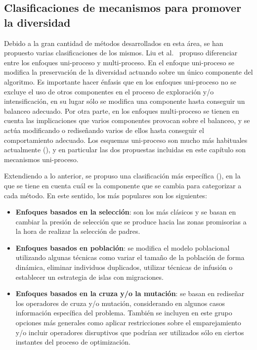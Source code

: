 \subsection{Clasificaciones de mecanismos para promover la diversidad}

Debido a la gran cantidad de métodos desarrollados en esta área, se han propuesto varias clasificaciones de los mismos.
%
Liu et al.~\cite{liu2009explore} propuso diferenciar entre los enfoques uni-proceso y multi-proceso.
%
En el enfoque uni-proceso se modifica la preservación de la diversidad actuando sobre un único componente del algoritmo. 
%
Es importante hacer énfasis que en los enfoques uni-proceso no se excluye el uso de otros componentes en el proceso de exploración y/o intensificación, en su lugar sólo se modifica una componente hasta conseguir un balanceo adecuado.
%
Por otra parte, en los enfoques multi-proceso se tienen en cuenta las implicaciones que varios componentes 
provocan sobre el balanceo, y se actúa modificando o rediseñando varios de ellos hasta conseguir el comportamiento adecuado.
%
Los esquemas uni-proceso son mucho más habituales actualmente (\cite{Crepinsek:13}), y en particular las dos propuestas incluidas en este capítulo son mecanismos
uni-proceso.

Extendiendo a lo anterior, se propuso una clasificación más específica (\cite{Crepinsek:13}), en la que se tiene en cuenta cuál es la componente que se cambia para categorizar a cada método.
%
En este sentido, los más populares son los siguientes:

\begin{itemize}
\item \textbf{Enfoques basados en la selección}: son los más clásicos y se basan en cambiar la presión de selección que se produce hacia las zonas promisorias a la hora de realizar
la selección de padres.
\item \textbf{Enfoques basados en población}: se modifica el modelo poblacional utilizando algunas técnicas como variar el tamaño de la población de forma dinámica, eliminar individuos duplicados, utilizar técnicas de infusión o establecer un estrategia de islas con migraciones.
\item \textbf{Enfoques basados en la cruza y/o la mutación}: se basan en rediseñar los operadores de cruza y/o mutación, considerando en algunos casos información específica del problema. También se incluyen en este grupo opciones más generales como aplicar restricciones sobre el emparejamiento y/o incluir operadores disruptivos que podrían ser utilizados sólo en ciertos instantes del proceso
de optimización.
\end{itemize}


